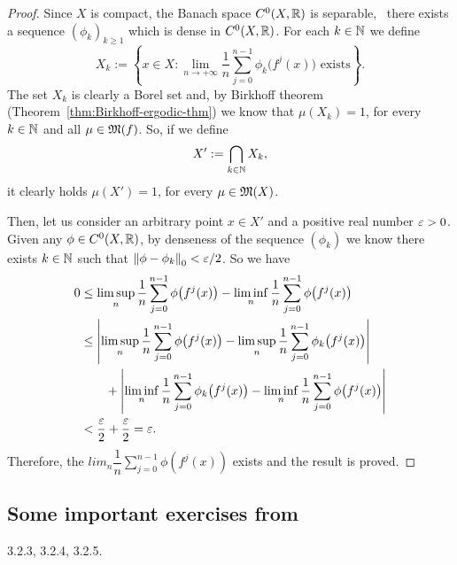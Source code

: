\begin{proof}
  Since $X$ is compact, the Banach space $C^{0}(X,\mathbb{R})$ is separable, \ie~there exists a sequence ${(\phi_{k})}_{k\geq 1}$ which is dense in $C^{0}(X,\mathbb{R})$. For each $k\in\mathbb{N}$ we define
  \begin{displaymath}
    X_{k}:=\left\{x\in X : \lim_{n\to+\infty}\frac{1}{n}\sum_{j=0}^{n-1}\phi_{k}\big(f^{j}(x)\big) \text{ exists}\right\}.
  \end{displaymath}
  The set $X_{k}$ is clearly a Borel set and, by Birkhoff theorem (Theorem~\ref{thm:Birkhoff-ergodic-thm}) we know that $\mu(X_{k})=1$, for every $k\in\mathbb{N}$ and all $\mu\in\operatorname{\mathfrak{M}}(f)$. So, if we define
  \begin{displaymath}
    X':=\bigcap_{k\in\mathbb{N}} X_{k},
  \end{displaymath}
  it clearly holds $\mu(X')=1$, for every $\mu\in\operatorname{\mathfrak{M}}(X)$.

  Then, let us consider an arbitrary point $x\in X'$ and a positive real number $\varepsilon>0$. Given any $\phi\in C^{0}(X,\mathbb{R})$, by denseness of the sequence $(\phi_{k})$ we know there exists $k\in\mathbb{N}$ such that $\left\|{\phi-\phi_{k}}\right\|_{0}<\varepsilon/2$. So we have
  \begin{displaymath}
    \begin{split}
      0&\leq \limsup_{n}\frac{1}{n}\sum_{j=0}^{n-1}\phi\big(f^{j}(x)\big) - \liminf_{n}\frac{1}{n}\sum_{j=0}^{n-1}\phi\big(f^{j}(x)\big) \\
       & \leq \left\lvert{\limsup_{n}\frac{1}{n}\sum_{j=0}^{n-1}\phi\big(f^{j}(x)\big) - \limsup_{n}\frac{1}{n}\sum_{j=0}^{n-1}\phi_{k}\big(f^{j}(x)\big)}\right\rvert \\
       &\qquad+ \left\lvert{\liminf_{n}\frac{1}{n}\sum_{j=0}^{n-1}\phi_{k}\big(f^{j}(x)\big)-\liminf_{n}\frac{1}{n}\sum_{j=0}^{n-1}\phi\big(f^{j}(x)\big)}\right\rvert \\
      &<\frac{\varepsilon}{2}+\frac{\varepsilon}{2} = \varepsilon.
    \end{split}
  \end{displaymath}
  Therefore, the  $lim_{n}\dfrac{1}{n}\sum_{j=0}^{n-1}\phi(f^{j}(x))$ exists and the result is proved.
\end{proof}


\subsection{Some important exercises from~\cite[\S3.2.4]{VianaOliveiraFoundErgTh}}
\label{sec:some-import-exerc-3.2.4}

3.2.3, 3.2.4, 3.2.5.
